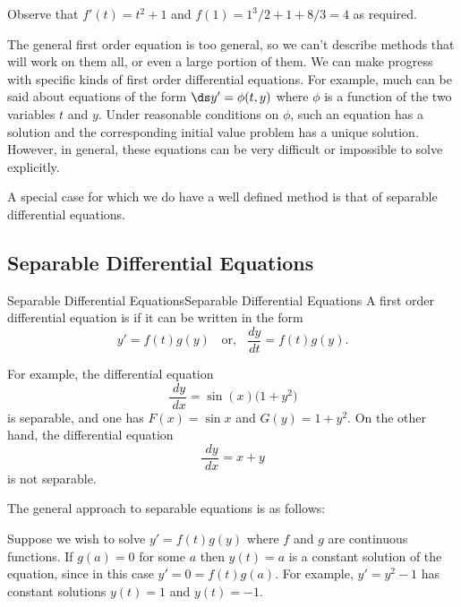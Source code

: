 \begin{solution}
Observe that $f'(t)=t^2+1$ and $f(1)=1^3/2+1+8/3=4$ as required.
\end{solution}

The general first order equation is too general, so
we can't describe methods that will work on them all, or even a large
portion of them. We can make progress with specific kinds of
first order differential equations.
For example, much can be said about equations of the form
$\ds y' = \phi (t, y)$ where $\phi $
is a function of the two variables $t$ and $y$.
Under reasonable conditions on $\phi$, such an
equation has a solution and the corresponding 
initial value problem has a unique solution.
However, in general, these equations can be very difficult or
impossible to solve explicitly.

A special case for which we do have a well defined method is that of separable differential equations.

\subsection{Separable Differential Equations}




\begin{definition}{Separable Differential Equations}{Separable Differential Equations}\label{Separable Differential Equations}
A first order differential equation is 
 if it can be written in the form
$$y' = f(t) g(y) \;\;\text{ or, }\;\;\frac{dy}{dt} = f(t) g(y).$$
\end{definition}

For example, the differential equation 
\[
  \frac{\; d y}{\; d x} = \sin(x) \bigl(1+y^2\bigr)
\]
is separable, and one has $F(x) = \sin x$ and $G(y) = 1+y^2$.
On the other hand, the differential equation
\[
  \frac{\; d y}{\; d x} = x+y
\]
is not separable.


The general approach to separable equations is as follows:

Suppose we wish to solve $y' =
f(t) g(y) $ where $f$ and $g$ are continuous functions. If $g(a)=0$
for some $a$ then $y(t)=a$ is a constant solution of the equation,
since in this case $y' = 0 = f(t)g(a)$.  For example, $y'
=y^2 -1$ has constant solutions $y(t)=1$ and $y(t)=-1$.

